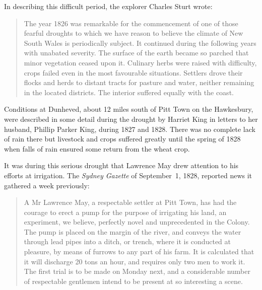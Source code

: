 In describing this difficult period, the explorer Charles Sturt wrote:
\begin{quote}
	The year 1826 was remarkable for the commencement of one of
	those fearful droughts to which we have reason to believe the
	climate of New South Wales is periodically subject.  It
	continued during the following years with unabated severity.
	The surface of the earth became so parched that minor
	vegetation ceased upon it.  Culinary herbs were raised with
	difficulty, crops failed even in the most favourable
	situations.  Settlers drove their flocks and herds to distant
	tracts for pasture and water, neither remaining in the located
	districts.  The interior suffered equally with the
	coast.
\end{quote}

Conditions at Dunheved, about 12 miles south of Pitt Town on the
Hawkesbury, were described in some detail during the drought by
Harriet King in letters to her husband, Phillip Parker King, during
1827 and 1828. There was no complete lack of rain there but livestock
and crops suffered greatly until the spring of 1828 when falls of rain
ensured some return from the wheat crop.

It was during this serious drought that Lawrence May drew attention to
his efforts at irrigation.  The \textsl{Sydney Gazette} of
September~1, 1828, reported news it gathered a week previously:
\begin{quote}
	A Mr Lawrence May, a respectable settler at Pitt Town, has had
	the courage to erect a pump for the purpose of irrigating his
	land, an experiment, we believe, perfectly novel and
	unprecedented in the Colony. The pump is placed on the margin
	of the river, and conveys the water through lead pipes into a
	ditch, or trench, where it is conducted at pleasure, by means
	of furrows to any part of his farm. It is calculated that it
	will discharge 20 tons an hour, and requires only two men to
	work it. The first trial is to be made on Monday next, and a
	considerable number of respectable gentlemen intend to be
	present at so interesting a scene.
\end{quote}

